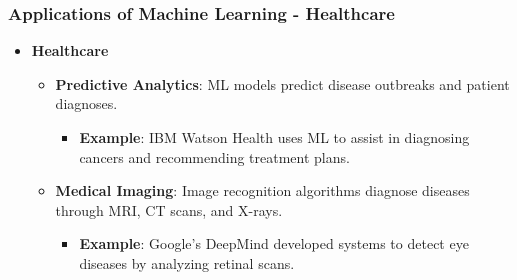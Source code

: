 \documentclass[aspectratio=169]{beamer}
\begin{document}
\begin{frame}[fragile]
    \frametitle{Applications of Machine Learning - Healthcare}
    \begin{itemize}
        \item \textbf{Healthcare}
        \begin{itemize}
            \item \textbf{Predictive Analytics}: ML models predict disease outbreaks and patient diagnoses.
            \begin{itemize}
                \item \textbf{Example}: IBM Watson Health uses ML to assist in diagnosing cancers and recommending treatment plans.
            \end{itemize}
            \item \textbf{Medical Imaging}: Image recognition algorithms diagnose diseases through MRI, CT scans, and X-rays.
            \begin{itemize}
                \item \textbf{Example}: Google's DeepMind developed systems to detect eye diseases by analyzing retinal scans.
            \end{itemize}
        \end{itemize}
    \end{itemize}
\end{frame}
\end{document}
